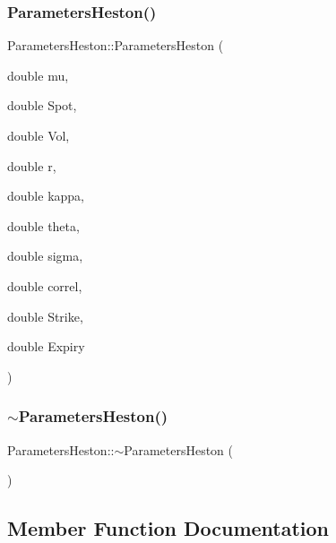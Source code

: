 \subsubsection{\texorpdfstring{Parameters\+Heston()}{ParametersHeston()}}
{\footnotesize\ttfamily Parameters\+Heston\+::\+Parameters\+Heston (\begin{DoxyParamCaption}\item[{double}]{mu,  }\item[{double}]{Spot,  }\item[{double}]{Vol,  }\item[{double}]{r,  }\item[{double}]{kappa,  }\item[{double}]{theta,  }\item[{double}]{sigma,  }\item[{double}]{correl,  }\item[{double}]{Strike,  }\item[{double}]{Expiry }\end{DoxyParamCaption})\hspace{0.3cm}{\ttfamily [inline]}}

\hypertarget{classParametersHeston_a94ec1ac10e605de7146975e832cc2224}{}\label{classParametersHeston_a94ec1ac10e605de7146975e832cc2224} 
\subsubsection{\texorpdfstring{$\sim$\+Parameters\+Heston()}{~ParametersHeston()}}
{\footnotesize\ttfamily Parameters\+Heston\+::$\sim$\+Parameters\+Heston (\begin{DoxyParamCaption}{ }\end{DoxyParamCaption})\hspace{0.3cm}{\ttfamily [inline]}}



\subsection{Member Function Documentation}
\hypertarget{classParametersHeston_a690e2f7928173c82e304eab1fb91fc08}{}\label{classParametersHeston_a690e2f7928173c82e304eab1fb91fc08} 
